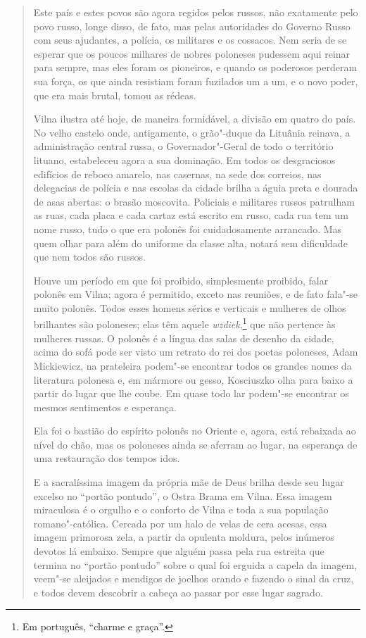 \begin{quote}
Este país e estes povos são agora regidos pelos russos, não exatamente
pelo povo russo, longe disso, de fato, mas pelas autoridades do Governo
Russo com seus ajudantes, a polícia, os militares e os cossacos. Nem
seria de se esperar que os poucos milhares de nobres poloneses pudessem
aqui reinar para sempre, mas eles foram os pioneiros, e quando os
poderosos perderam sua força, os que ainda resistiam foram fuzilados um
a um, e o novo poder, que era mais brutal, tomou as rédeas.

Vilna ilustra até hoje, de maneira formidável, a divisão em quatro do
país. No velho castelo onde, antigamente, o grão"-duque da Lituânia
reinava, a administração central russa, o Governador"-Geral de todo o
território lituano, estabeleceu agora a sua dominação. Em todos os
desgraciosos edifícios de reboco amarelo, nas casernas, na sede dos
correios, nas delegacias de polícia e nas escolas da cidade brilha a
águia preta e dourada de asas abertas: o brasão moscovita. Policiais e
militares russos patrulham as ruas, cada placa e cada cartaz está
escrito em russo, cada rua tem um nome russo, tudo o que era polonês foi
cuidadosamente arrancado. Mas quem olhar para além do uniforme da classe
alta, notará sem dificuldade que nem todos são russos.

Houve um período em que foi proibido, simplesmente proibido, falar
polonês em Vilna; agora é permitido, exceto nas reuniões, e de fato
fala"-se muito polonês. Todos esses homens sérios e verticais e mulheres
de olhos brilhantes são poloneses; elas têm aquele \textit{wzdiek},\footnote{Em português, ``charme e
graça''.} que não pertence às mulheres russas. O polonês é a língua das
salas de desenho da cidade, acima do sofá pode ser visto um retrato do
rei dos poetas poloneses, Adam Mickiewicz, na prateleira podem"-se
encontrar todos os grandes nomes da literatura polonesa e, em mármore ou
gesso, Kosciuszko olha para baixo a partir do lugar que lhe coube. Em
quase todo lar podem"-se encontrar os mesmos sentimentos e esperança.

Ela foi o bastião do espírito polonês no Oriente e, agora, está
rebaixada ao nível do chão, mas os poloneses ainda se aferram ao lugar,
na esperança de uma restauração dos tempos idos.

E a sacralíssima imagem da própria mãe de Deus brilha desde seu lugar
excelso no ``portão pontudo'', o Ostra Brama em Vilna. Essa imagem
miraculosa é o orgulho e o conforto de Vilna e toda a sua população
romano"-católica. Cercada por um halo de velas de cera acesas, essa
imagem primorosa zela, a partir da opulenta moldura, pelos inúmeros
devotos lá embaixo. Sempre que alguém passa pela rua estreita que
termina no ``portão pontudo'' sobre o qual foi erguida a capela da imagem,
veem"-se aleijados e mendigos de joelhos orando e fazendo o sinal da
cruz, e todos devem descobrir a cabeça ao passar por esse lugar sagrado.


\end{quote}

